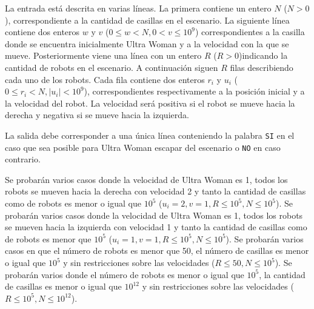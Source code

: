 \documentclass{oci}
\begin{document}
\clearpage
\begin{inputDescription}
  La entrada está descrita en varias líneas.
  La primera contiene un entero $N$ ($N>0$), correspondiente a la cantidad de
  casillas en el escenario.
  La siguiente línea contiene dos enteros $w$ y $v$ ($0\leq w< N, 0<v\leq 10^9$)
  correspondientes a la casilla donde se encuentra inicialmente Ultra Woman y a la
  velocidad con la que se mueve.
  Posteriormente viene una línea con un entero $R$ ($R>0$)indicando la cantidad de
  robots en el escenario.
  A continuación siguen $R$ filas describiendo cada uno de los robots.
  Cada fila contiene dos enteros $r_i$ y $u_i$ ($0\leq r_i < N, |u_i|< 10^9$),
  correspondientes respectivamente a la posición inicial y a la velocidad del
  robot.
  La velocidad será positiva si el robot se mueve hacia la derecha y negativa si
  se mueve hacia la izquierda.
\end{inputDescription}

\begin{outputDescription}
La salida debe corresponder a una única línea conteniendo la palabra \texttt{SI}
en el caso que sea posible para Ultra Woman escapar del escenario o \texttt{NO}
en caso contrario.
\end{outputDescription}

\begin{scoreDescription}
   Se probarán varios casos donde la velocidad de Ultra Woman es 1,
  todos los robots se mueven hacia la derecha con velocidad 2 y tanto la
  cantidad de casillas como de robots es menor o igual que $10^5$ ($u_i=2, v=1,
  R\leq 10^5, N\leq 10^5$).
   Se probarán varios casos donde la velocidad de Ultra Woman es 1,
  todos los robots se mueven hacia la izquierda con velocidad 1 y tanto la cantidad
  de casillas como de robots es menor que $10^5$ ($u_i=1, v=1, R\leq 10^5,
  N\leq 10^5$).
   Se probarán varios casos en que el número de robots es menor que
  50, el número de casillas es menor o igual que $10^5$ y sin restricciones sobre las
  velocidades ($R\leq 50, N\leq 10^5$).
   Se probarán varios donde el número de robots es menor o igual que
  $10^5$, la cantidad de casillas es menor o igual que $10^{12}$ y sin
  restricciones sobre las velocidades ($R\leq 10^5, N \leq10^{12}$).
\end{scoreDescription}

\begin{sampleDescription}
\end{sampleDescription}
\end{document}
